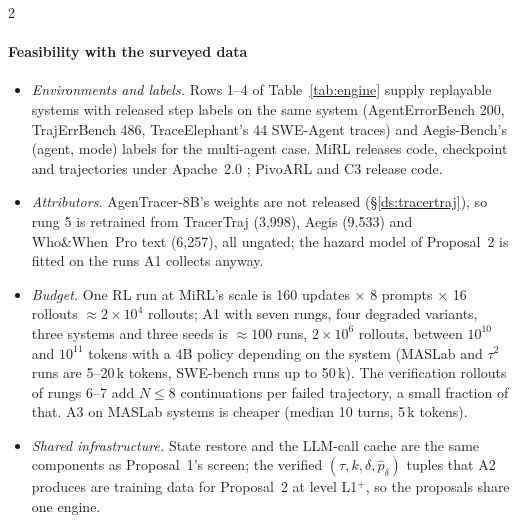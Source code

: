 \begin{multicols}{2}
\paragraph{Feasibility with the surveyed data}
\begin{itemize}[leftmargin=1.1em]
\item \emph{Environments and labels.} Rows 1--4 of Table~\ref{tab:engine} supply replayable systems with released step labels on the same system (AgentErrorBench 200, TrajErrBench 486, TraceElephant's 44 SWE-Agent traces) and Aegis-Bench's (agent, mode) labels for the multi-agent case. MiRL releases code, checkpoint and trajectories under Apache~2.0 \cite{tian2026mirl}; PivoARL and C3 release code.
\item \emph{Attributors.} AgenTracer-8B's weights are not released (\S\ref{ds:tracertraj}), so rung 5 is retrained from TracerTraj (3,998), Aegis (9,533) and Who\&When~Pro text (6,257), all ungated; the hazard model of Proposal~2 is fitted on the runs A1 collects anyway.
\item \emph{Budget.} One RL run at MiRL's scale is 160 updates $\times$ 8 prompts $\times$ 16 rollouts $\approx 2\times10^4$ rollouts; A1 with seven rungs, four degraded variants, three systems and three seeds is $\approx100$ runs, $2\times10^6$ rollouts, between $10^{10}$ and $10^{11}$ tokens with a 4B policy depending on the system (MASLab and $\tau^2$ runs are 5--20\,k tokens, SWE-bench runs up to 50\,k). The verification rollouts of rungs 6--7 add $N\le8$ continuations per failed trajectory, a small fraction of that. A3 on MASLab systems is cheaper (median 10 turns, 5\,k tokens).
\item \emph{Shared infrastructure.} State restore and the LLM-call cache are the same components as Proposal~1's screen; the verified $(\tau,k,\delta,\hat p_\delta)$ tuples that A2 produces are training data for Proposal~2 at level L1$^{+}$, so the proposals share one engine.
\end{itemize}


\end{multicols}
